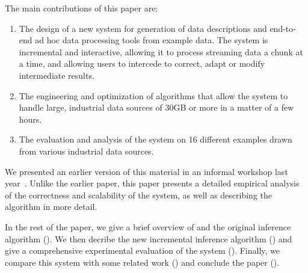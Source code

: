 The main contributions of this paper are:
\begin{enumerate}
\item The design of a new system for generation of data descriptions
and end-to-end ad hoc data processing tools from example data.  
The system is incremental and interactive, allowing it to process
streaming data a chunk at a time, and allowing users to intercede
to correct, adapt or modify intermediate results. 
\item The engineering and optimization of algorithms that allow
the system to handle large, industrial data sources of 30GB or
more in a matter of a few hours.
\item The evaluation and analysis of the system
on 16 different examples drawn from
various industrial data sources.
\end{enumerate}

We presented an earlier version of this material in an informal workshop last year~\cite{wasl09:fisher+}. 
Unlike the earlier paper, this paper presents a detailed empirical analysis of the correctness and scalability of the system,
as well as describing the algorithm in more detail.

In the rest of the paper, we give a brief overview of \pads{} and the original
\learnpads{} inference algorithm (). We then decribe
the new incremental inference algorithm ()
and give a comprehensive experimental
evaluation of the system (). Finally, we compare this
system with some related work () and conclude
the paper ().
